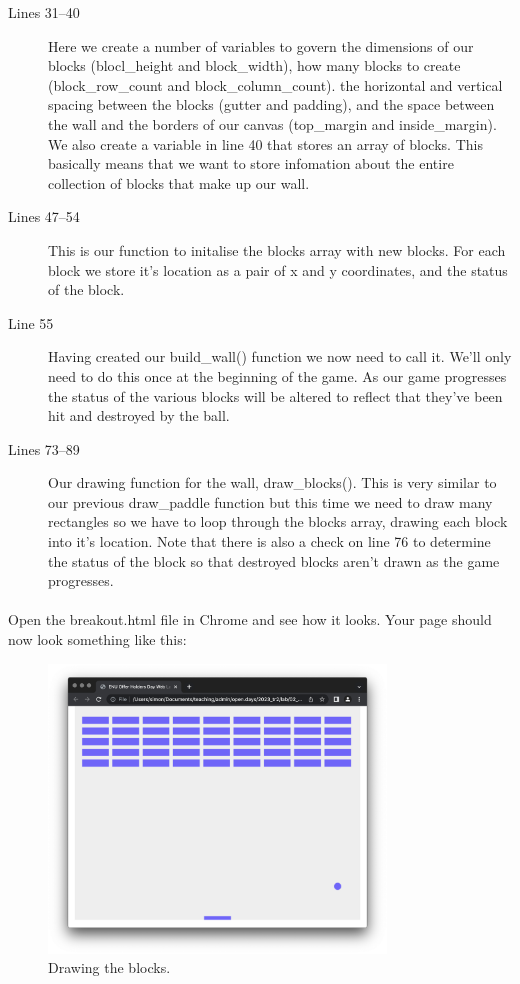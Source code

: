 \documentclass[10pt, a4paper, oneside]{article}
\begin{document}
\begin{description}
\item[Lines 31--40] Here we create a number of variables to govern the dimensions of our blocks (blocl\_height and block\_width), how many blocks to create (block\_row\_count and block\_column\_count). the horizontal and vertical spacing between the blocks (gutter and padding), and the space between the wall and the borders of our canvas (top\_margin and inside\_margin). We also create a variable in line 40 that stores an array of blocks. This basically means that we want to store infomation about the entire collection of blocks that make up our wall.
\item[Lines 47--54] This is our function to initalise the blocks array with new blocks. For each block we store it's location as a pair of x and y coordinates, and the status of the block.
\item[Line 55] Having created our build\_wall() function we now need to call it. We'll only need to do this once at the beginning of the game. As our game progresses the status of the various blocks will be altered to reflect that they've been hit and destroyed by the ball.
\item[Lines 73--89] Our drawing function for the wall, draw\_blocks(). This is very similar to our previous draw\_paddle function but this time we need to draw many rectangles so we have to loop through the blocks array, drawing each block into it's location. Note that there is also a check on line 76 to determine the status of the block so that destroyed blocks aren't drawn as the game progresses.
\end{description}

\paragraph{} Open the breakout.html file in Chrome and see how it looks. Your page should now look something like this:

\begin{figure}[H]
\centering
\includegraphics[width=0.8\textwidth]{images/02_drawing+c_draw_blocks.png}
\caption{Drawing the blocks.}
\label{fig:02_drawing+c_draw_blocks}
\end{figure}
\end{document}
